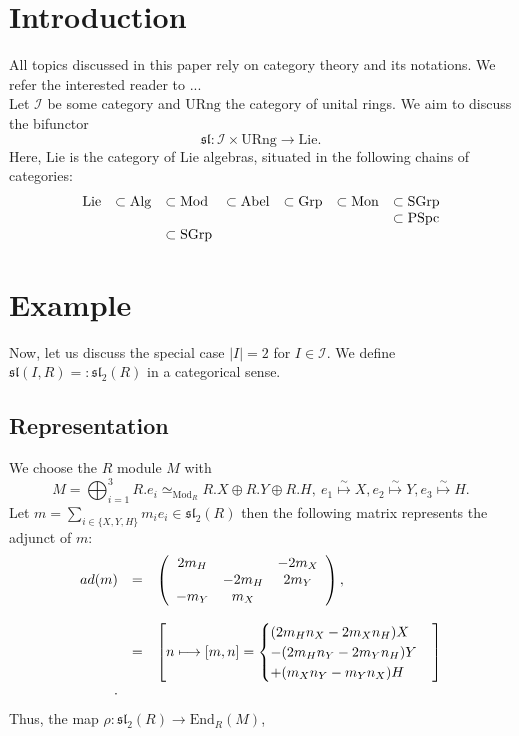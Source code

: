 \section{Introduction}
All topics discussed in this paper rely on category theory and its notations. We refer the interested reader to ...\\
\indent Let $\mathcal{I}$ be some category and $\mathrm{URng}$ the category of unital rings. We aim to discuss the bifunctor 
$$\mathfrak{sl} : \mathcal{I} \times \mathrm{URng} \longrightarrow \mathrm{Lie}.$$
Here, $\mathrm{Lie}$ is the category of Lie algebras, situated in the following chains of categories:
$$\bao{lllllll}
\mathrm{Lie} &\subset \mathrm{Alg} &\subset \mathrm{Mod} &\subset \mathrm{Abel} &\subset \mathrm{Grp} &\subset \mathrm{Mon} &\subset \mathrm{SGrp}\\
&&&&&& \subset \mathrm{PSpc}\\
&& \subset \mathrm{SGrp}&&&&\\
\ea$$

\newpage
\newcommand{\sltwor}{\mathfrak{sl}_2(R)}
\section{Example}
Now, let us discuss the special case $|I| = 2$ for $I \in \mathcal{I}$. We define $\mathfrak{sl}(I,R) =: \sltwor$ in a categorical sense.
\subsection{Representation}
We choose the $R$ module $M$ with
$$M = \bigoplus_{i=1}^3 R.e_i \simeq_{\mathrm{Mod}_R} R.X \oplus R.Y \oplus R.H,\ e_1 \stackrel{\sim}{\longmapsto} X, e_2 \stackrel{\sim}{\longmapsto} Y,e_3 \stackrel{\sim}{\longmapsto} H.$$
Let $m = \sum_{i \in \{X,Y,H\}} m_i e_i \in \sltwor$ then the following matrix represents the adjunct of $m$:
$$\bao{rcl}
ad(m) &=& \left(\bao{ccc}
2 m_H & & -2 m_X\\
& -2 m_H & 2 m_Y\\
-m_Y&m_X&\\
\ea\right),\\
 &&\\
 &=& \left[ n \longmapsto [m,n] = \begin{cases}(2 m_H n_X - 2 m_X n_H) X\\ - (2 m_H n_Y - 2 m_Y n_H) Y\\ + ( m_X n_Y - m_Y n_X) H\end{cases}\right]\\.
 \ea$$
Thus, the map $\rho : \sltwor \longrightarrow \mathrm{End}_R(M)$, 